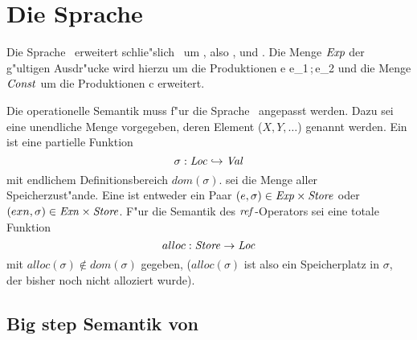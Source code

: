 \section{Die Sprache \LFOUR}

Die Sprache \LFOUR\ erweitert schlie"slich \LTHREE\ um , also ,  und
. Die Menge ${\text{\it Exp\/}}$ der g"ultigen Ausdr"ucke wird hierzu um die Produktionen
\bgram
e \is {}
  \al {}
  \al e_1\,;\,e_2
\egram
und die Menge ${\text{\it Const\/}}$ um die Produktionen 
\bgram
c \is \Ref \mid \Deref \mid \Assign
\egram
erweitert.

Die operationelle Semantik muss f"ur die Sprache \LFOUR\ angepasst werden. Dazu sei eine unendliche Menge \notation{$\Loc$} vorgegeben,
deren Element ($X, Y, \ldots$)   genannt werden. Ein 
 ist eine partielle Funktion
\[
  \sigma: {\text{\it Loc\/}} \hookrightarrow {\text{\it Val\/}}
\]
mit endlichem Definitionsbereich $dom(\sigma)$.
 sei die Menge aller Speicherzust"ande. Eine  ist entweder ein Paar
$(e,\sigma) \in {\text{\it Exp\/}} \times {\text{\it Store\/}}$ oder $(exn, \sigma) \in {\text{\it Exn\/}} \times {\text{\it Store\/}}$. F"ur die Semantik des
${\text{\it ref\/}}$-Operators sei eine totale Funktion
\[
  alloc: {\text{\it Store\/}} \to {\text{\it Loc\/}}
\]
mit $alloc(\sigma) \not\in dom(\sigma)$ gegeben, ($alloc(\sigma)$ ist also ein Speicherplatz in $\sigma$,
der bisher noch nicht alloziert wurde).


\subsection{Big step Semantik von \LFOUR}


